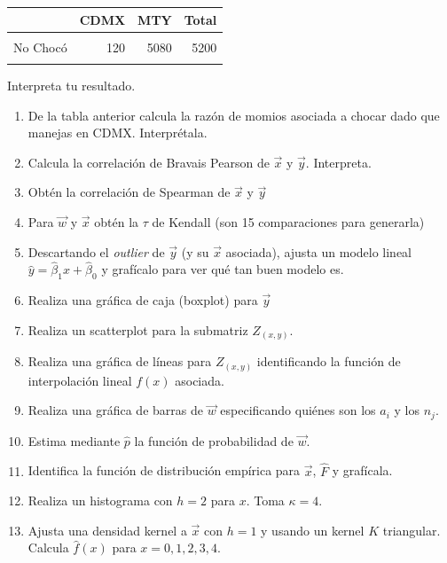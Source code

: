 \documentclass[
]{book}
\begin{document}
\begin{table}
\centering
\begin{tabular}{l|r|r|r}
\hline
  & CDMX & MTY & Total\\
\hline
\cellcolor{gray!6}{Chocó} & \cellcolor{gray!6}{1100} & \cellcolor{gray!6}{4000} & \cellcolor{gray!6}{5100}\\
\hline
No Chocó & 120 & 5080 & 5200\\
\hline
\cellcolor{gray!6}{Total} & \cellcolor{gray!6}{1220} & \cellcolor{gray!6}{9080} & \cellcolor{gray!6}{10300}\\
\hline
\end{tabular}
\end{table}

Interpreta tu resultado.

\begin{enumerate}
\def\labelenumi{\arabic{enumi}.}
\setcounter{enumi}{15}
\item
  De la tabla anterior calcula la razón de momios asociada a chocar dado que manejas en CDMX. Interprétala.
\item
  Calcula la correlación de Bravais Pearson de \(\vec{x}\) y \(\vec{y}\). Interpreta.
\item
  Obtén la correlación de Spearman de \(\vec{x}\) y \(\vec{y}\)
\item
  Para \(\vec{w}\) y \(\vec{x}\) obtén la \(\tau\) de Kendall (son 15 comparaciones para generarla)
\item
  Descartando el \emph{outlier} de \(\vec{y}\) (y su \(\vec{x}\) asociada), ajusta un modelo lineal \(\hat{y} = \hat{\beta}_1 x + \hat{\beta}_0\) y grafícalo para ver qué tan buen modelo es.
\item
  Realiza una gráfica de caja (boxplot) para \(\vec{y}\)
\item
  Realiza un scatterplot para la submatriz \(Z_{(x,y)}\).
\item
  Realiza una gráfica de líneas para \(Z_{(x,y)}\) identificando la función de interpolación lineal \(f(x)\) asociada.
\item
  Realiza una gráfica de barras de \(\vec{w}\) especificando quiénes son los \(a_i\) y los \(n_j\).
\item
  Estima mediante \(\hat{p}\) la función de probabilidad de \(\vec{w}\).
\item
  Identifica la función de distribución empírica para \(\vec{x}\), \(\hat{F}\) y grafícala.
\item
  Realiza un histograma con \(h = 2\) para \(x\). Toma \(\kappa = 4\).
\item
  Ajusta una densidad kernel a \(\vec{x}\) con \(h = 1\) y usando un kernel \(K\) triangular. Calcula \(\hat{f}(x)\) para \(x = 0,1,2,3,4\).
\end{enumerate}
\end{document}
